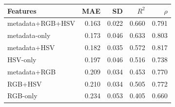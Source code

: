 \begin{tabular}{lrrrr}
\toprule
Features & MAE & SD & $R^2$ & $\rho$ \\
\midrule
metadata+RGB+HSV & 0.163 & 0.022 & 0.660 & 0.791 \\
metadata-only & 0.173 & 0.046 & 0.633 & 0.803 \\
metadata+HSV & 0.182 & 0.035 & 0.572 & 0.817 \\
HSV-only & 0.197 & 0.046 & 0.516 & 0.738 \\
metadata+RGB & 0.209 & 0.034 & 0.453 & 0.770 \\
RGB+HSV & 0.210 & 0.034 & 0.505 & 0.772 \\
RGB-only & 0.234 & 0.053 & 0.405 & 0.660 \\
\bottomrule
\end{tabular}
